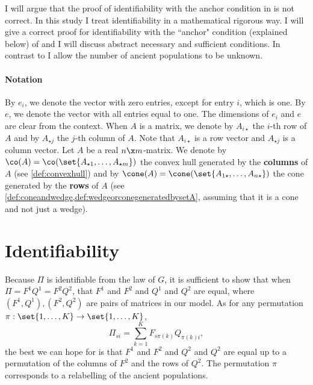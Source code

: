 \documentclass[12pt,a4paper]{article}
\begin{document}
  
I will argue that the  proof of  identifiability with the anchor condition in \cite{CabrerosStorey2019} is not correct.  In this study I treat  identifiability in a mathematical rigorous way. I will give a correct proof for identifiability with the ``anchor" condition (explained below) of \cite{CabrerosStorey2019} and I will discuss abstract necessary and sufficient conditions. In contrast to \cite{CabrerosStorey2019} I allow the number of ancient populations to be unknown.  

\paragraph{Notation}
By $e_i$, we denote the vector with zero entries, except for entry $i$, which is one.
 By $e$, we denote the vector with all entries equal to one. 
 The dimensions of $e_i$ and $e$ are clear from the context. When $A$ is a matrix, we denote by $A_{i\star }$ the $i$-th row of $A$ and by $A_{\star j}$ the $j$-th column of $A$. Note that $A_{i\star}$ is a row vector and $A_{\star j}$ is a column vector. Let $A$ be a real  $n\x m$-matrix. We denote by $\co(A)=\co(\set{A_{\star1},\ldots, A_{\star m}})$ the convex hull generated by the \textbf{columns} of $A$ (see \cref{def:convexhull}) and by $\cone(A)=\cone(\set{A_{1\star},\ldots,A_{n\star}})$ the cone generated by the \textbf{rows} of $A$ (see \cref{def:coneandwedge,def:wedgeorconegeneratedbysetA}, assuming that it is a cone and not just a wedge). 
\paragraph{}

\section{Identifiability}



Because $\Pi$ is identifiable from the law of $G$, it is sufficient to show that when $\Pi=F^1Q^1=F^2Q^2$, that $F^1$ and $F^2$ and $Q^1$ and $Q^2$ are equal, where $(F^1,Q^1),(F^2,Q^2)$ are pairs of matrices in our model.
As for any permutation $\pi:\set{1,\ldots,K}\to \set{1,\ldots,K}$, 
\[
\Pi_{si}=\sum_{k=1}^KF_{s\pi(k)}Q_{\pi(k)i},
\]
the best we can hope for is that $F^1$ and $F^2$ and $Q^2$ and $Q^2$ are equal up to a permutation of the columns of $F^2$ and the rows of $Q^2$. 
The permutation $\pi$ corresponds to a relabelling of the ancient populations.
\end{document}
